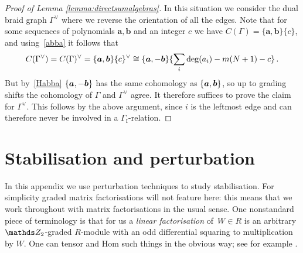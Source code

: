 \documentclass{compositio}
\theoremstyle{definition}
\numberwithin{equation}{section}
\begin{document}
\begin{proof}[Proof of Lemma \ref{lemma:directsumalgebras}]
In this situation we consider the dual braid graph $\Gamma^{\lor}$ where we reverse the orientation of all the edges. Note that for some sequences of polynomials $\boldsymbol{a},\boldsymbol{b}$ and an integer $c$ we have $C(\Gamma) = \{ \boldsymbol{a}, \boldsymbol{b} \}\{c\}$, and using~\eqref{abba} it follows that
\[
C(\Gamma^{\lor}) = C(\Gamma)^{\vee} = \{ \boldsymbol{a}, \boldsymbol{b} \}\{c\}^{\vee} \cong \{ \boldsymbol{a}, -\boldsymbol{b} \}\{ \sum_i \deg(a_i) - m(N+1) - c \}\,.
\]
But by~\eqref{Habba} $\{ \boldsymbol{a}, -\boldsymbol{b} \}$ has the same cohomology as $\{ \boldsymbol{a}, \boldsymbol{b} \}$, so up to grading shifts the cohomology of $\Gamma$ and $\Gamma^{\lor}$ agree. It therefore suffices to prove the claim for $\Gamma^{\lor}$. This follows by the above argument, since $i$ is the leftmost edge and can therefore never be involved in a $\Gamma_{\text{I}}$-relation.
\end{proof}

\section{Stabilisation and perturbation}\label{section:morphismpert}

In this appendix we use perturbation techniques to study stabilisation. For simplicity graded matrix factorisations will not feature here: this means that we work throughout with matrix factorisations in the usual sense. One nonstandard piece of terminology is that for us a \emph{linear factorisation} of~$W \in R$ is an arbitrary $\Ztwo$-graded $R$-module with an odd differential squaring to multiplication by $W$. One can tensor and Hom such things in the obvious way; see for example \cite[Section 2]{dm1102.2957}.
\end{document}
